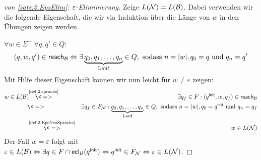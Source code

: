 \begin{proof}[von \autoref{satz:2.EpsElim}: $\varepsilon$-Eliminierung]
        Zeige $L(\mathcal{N})=L(\mathcal{B})$. Dabei verwenden wir die folgende Eigenschaft, die wir via Induktion über die Länge von $w$ in den Übungen zeigen werden.
        
        $\forall w\in\Sigma^+\; \forall q, q'\in Q:$
        $$(q,w,q')\in\textsf{reach}_{\mathcal{B}} \Leftrightarrow \exists \underbrace{q_0, q_1,\ldots, q_n}_{\text{Lauf}}\in Q, \text{ sodass }  n=|w|, q_0=q \text{ und } q_n=q'$$
        Mit Hilfe dieser Eigenschaft können wir nun leicht für $w \neq \varepsilon$ zeigen:
        \begin{eqnarray*}
         w\in L(\B) \hspace*{-1mm}
         &\stackrel{\text{\autoref{def:2.sprache}}}{\<=>} & \exists q_f\in F: (\qinit, w, q_f)\in\reach_\B\\
         &\<=> & \exists q_f\in F_\calN: \underbrace{q_0, q_1,\ldots, q_n}_{\text{Lauf}}\in Q, \text{ sodass }  n=|w|, q_0=\qinit \text{ und } q_n=q_f\\
         &\stackrel{\text{\autoref{def:2.EpsNeaSprache}}}{\<=>} & w \in L(\calN)
        \end{eqnarray*}
        Der Fall $w = \varepsilon$ folgt mit $\varepsilon \in L(\mathcal{B}) \Leftrightarrow \exists q \in F \cap \textsf{ecl}_{\mathcal{B}}(q^\mathsf{init}) \Leftrightarrow q^\mathsf{init} \in F_{\mathcal{N}} \Leftrightarrow \varepsilon \in L(\mathcal{N})$.
\end{proof}


